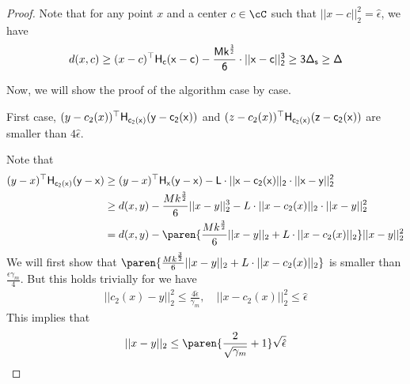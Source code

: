 \begin{proof}
    
    Note that for any point $x$ and a center $c \in \cC$ such that $||x - c||_2^2 = \hat{\epsilon}$, we have 
    \begin{align*}
        d(x,c) \ge (x-c)^{\top}\sf{H}_c(x-c) - \frac{M k^{\frac{3}{2}}}{6} \cdot||x-c||^{3}_2 \ge 3 \Delta_s \ge \Delta 
    \end{align*}
    
    Now, we will show the proof of the algorithm case by case.

    First case, $(y - c_2(x))^{\top}\sf{H}_{c_2(x)}(y - c_2(x))$ and $(z - c_2(x))^{\top}\sf{H}_{c_2(x)}(z - c_2(x))$ are smaller than $4 \hat{\epsilon}$.

    Note that 
    \begin{subequations}\label{eq: bound1}
    \begin{align}
        (y - x)^{\top}\sf{H}_{c_2(x)}(y - x) &\ge (y - x)^{\top}\sf{H}_{x}(y - x) - L\cdot ||x - c_2(x)||_2\cdot ||x - y||_2^2\\
        &\ge d(x,y) - \frac{M k^{\frac{3}{2}}}{6}||x - y||_2^3 - L\cdot ||x - c_2(x)||_2\cdot ||x - y||_2^2\\
        & = d(x,y) -\paren{\frac{M k^{\frac{3}{2}}}{6}||x - y||_2 + L\cdot ||x - c_2(x)||_2} ||x - y||_2^2
    \end{align}
    \end{subequations}
    We will first show that $\paren{\frac{M k^{\frac{3}{2}}}{6}||x - y||_2 + L\cdot ||x - c_2(x)||_2} $ is smaller than $\frac{\epsilon\gamma_m}{4}$. But this holds trivially for we have
    \begin{align*}
        ||c_2(x) - y||^2_2 \le \frac{4\hat{\epsilon}}{\gamma_m},\quad ||x - c_2(x)||^2_2 \le \hat{\epsilon}
    \end{align*}
    This implies that 
    \begin{align*}
        ||x - y||_2 \le \paren{\frac{2}{\sqrt{\gamma_m}} + 1}\sqrt{\hat{\epsilon}}
    \end{align*}
    

\end{proof}
